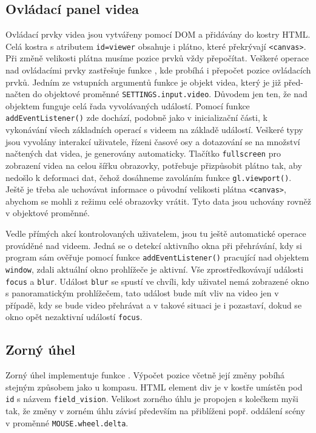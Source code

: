  


\subsection{Ovládací panel videa}
Ovládací prvky videa jsou vytvářeny pomocí DOM a přidávány do kostry HTML. Celá kostra s atributem \texttt{id=viewer} obsahuje i plátno, které překrývají \texttt{<canvas>}. Při změně velikosti plátna musíme pozice prvků vždy přepočítat. Veškeré operace nad ovládacími prvky zastřešuje funkce \texttt{\createVideoControlls}, kde probíhá i přepočet pozice ovládacích prvků. Jedním ze vstupních argumentů funkce je objekt videa, který je již před-načten do objektové proměnné \texttt{SETTINGS.input.video}. Důvodem jen ten, že  nad objektem funguje celá řada vyvolávaných událostí. Pomocí funkce \texttt{addEventListener()} zde dochází, podobně jako v inicializační části, k vykonávání všech základních operací s videem na základě událostí. Veškeré typy jsou vyvolány interakcí uživatele, řízeni časové osy a dotazování se na množství načtených dat videa, je generovány automaticky. Tlačítko \texttt{fullscreen} pro zobrazení videa na celou šířku obrazovky, potřebuje přizpůsobit plátno tak, aby nedošlo k deformaci dat, čehož dosáhneme zavoláním funkce \texttt{gl.viewport()}. Ještě je třeba ale uchovávat informace o původní velikosti plátna \texttt{<canvas>}, abychom se mohli z režimu celé obrazovky vrátit. Tyto data jsou uchovány rovněž v objektové proměnné.

Vedle přímých akcí kontrolovaných uživatelem, jsou tu ještě  automatické operace prováděné nad videem. Jedná se o detekcí aktivního okna při přehrávání, kdy si program sám ověřuje pomocí funkce \texttt{addEventListener()}  pracující nad objektem \texttt{window}, zdali aktuální okno prohlížeče je aktivní. Vše zprostředkovávají události   \texttt{focus} a \texttt{blur}. Událost  \texttt{blur} se spustí ve chvíli, kdy uživatel nemá zobrazené okno s panoramatickým prohlížečem, tato událost bude mít vliv na video jen v případě, kdy se bude video přehrávat a v takové situaci je i pozastaví, dokud se okno opět nezaktivní událostí \texttt{focus}.

\newpage

\subsection{Zorný úhel}
Zorný úhel implementuje funkce \texttt{\createFieldVision}. Výpočet pozice včetně její změny pobíhá stejným způsobem jako u kompasu. HTML element div je v kostře umístěn pod \texttt{id} s názvem  \texttt{field\_vision}. Velikost zorného úhlu je propojen s kolečkem myši tak, že změny v zorném úhlu závisí především na přiblíženi popř. oddálení scény v proměnné \texttt{MOUSE.wheel.delta}.

